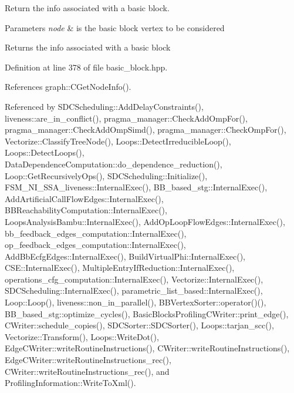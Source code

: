 Return the info associated with a basic block. 


\begin{DoxyParams}{Parameters}
{\em node} & is the basic block vertex to be considered \\
\hline
\end{DoxyParams}
\begin{DoxyReturn}{Returns}
the info associated with a basic block 
\end{DoxyReturn}


Definition at line 378 of file basic\+\_\+block.\+hpp.



References graph\+::\+C\+Get\+Node\+Info().



Referenced by S\+D\+C\+Scheduling\+::\+Add\+Delay\+Constraints(), liveness\+::are\+\_\+in\+\_\+conflict(), pragma\+\_\+manager\+::\+Check\+Add\+Omp\+For(), pragma\+\_\+manager\+::\+Check\+Add\+Omp\+Simd(), pragma\+\_\+manager\+::\+Check\+Omp\+For(), Vectorize\+::\+Classify\+Tree\+Node(), Loops\+::\+Detect\+Irreducible\+Loop(), Loops\+::\+Detect\+Loops(), Data\+Dependence\+Computation\+::do\+\_\+dependence\+\_\+reduction(), Loop\+::\+Get\+Recursively\+Ops(), S\+D\+C\+Scheduling\+::\+Initialize(), F\+S\+M\+\_\+\+N\+I\+\_\+\+S\+S\+A\+\_\+liveness\+::\+Internal\+Exec(), B\+B\+\_\+based\+\_\+stg\+::\+Internal\+Exec(), Add\+Artificial\+Call\+Flow\+Edges\+::\+Internal\+Exec(), B\+B\+Reachability\+Computation\+::\+Internal\+Exec(), Loops\+Analysis\+Bambu\+::\+Internal\+Exec(), Add\+Op\+Loop\+Flow\+Edges\+::\+Internal\+Exec(), bb\+\_\+feedback\+\_\+edges\+\_\+computation\+::\+Internal\+Exec(), op\+\_\+feedback\+\_\+edges\+\_\+computation\+::\+Internal\+Exec(), Add\+Bb\+Ecfg\+Edges\+::\+Internal\+Exec(), Build\+Virtual\+Phi\+::\+Internal\+Exec(), C\+S\+E\+::\+Internal\+Exec(), Multiple\+Entry\+If\+Reduction\+::\+Internal\+Exec(), operations\+\_\+cfg\+\_\+computation\+::\+Internal\+Exec(), Vectorize\+::\+Internal\+Exec(), S\+D\+C\+Scheduling\+::\+Internal\+Exec(), parametric\+\_\+list\+\_\+based\+::\+Internal\+Exec(), Loop\+::\+Loop(), liveness\+::non\+\_\+in\+\_\+parallel(), B\+B\+Vertex\+Sorter\+::operator()(), B\+B\+\_\+based\+\_\+stg\+::optimize\+\_\+cycles(), Basic\+Blocks\+Profiling\+C\+Writer\+::print\+\_\+edge(), C\+Writer\+::schedule\+\_\+copies(), S\+D\+C\+Sorter\+::\+S\+D\+C\+Sorter(), Loops\+::tarjan\+\_\+scc(), Vectorize\+::\+Transform(), Loops\+::\+Write\+Dot(), Edge\+C\+Writer\+::write\+Routine\+Instructions(), C\+Writer\+::write\+Routine\+Instructions(), Edge\+C\+Writer\+::write\+Routine\+Instructions\+\_\+rec(), C\+Writer\+::write\+Routine\+Instructions\+\_\+rec(), and Profiling\+Information\+::\+Write\+To\+Xml().

